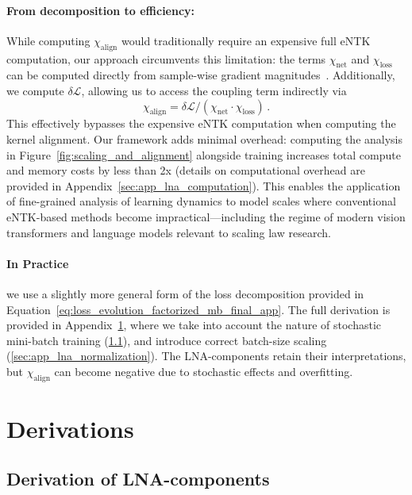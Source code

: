 \paragraph{From decomposition to efficiency:} While computing $\chi_{\text{align}}$ would traditionally require an expensive full eNTK computation, our approach circumvents this limitation: the terms $\chi_{\text{net}}$ and $\chi_{\text{loss}}$ can be computed directly from sample-wise gradient magnitudes~\cite{novak19a-pre,yousefpour22a-pre}. Additionally, we compute $\delta \mathcal{L}$, allowing us to access the coupling term indirectly via 
\begin{equation}
    {\chi_{\text{align}} = {\delta \mathcal{L}} / ({\chi_{\text{net}} \cdot \chi_{\text{loss}}})} \, .
\end{equation}
This effectively bypasses the expensive eNTK computation when computing the kernel alignment.  
Our framework adds minimal overhead: computing the analysis in Figure~\ref{fig:scaling_and_alignment} alongside training increases total compute and memory costs by less than 2x (details on computational overhead are provided in Appendix~\ref{sec:app_lna_computation}).
This enables the application of fine-grained analysis of learning dynamics to model scales where conventional eNTK-based methods become impractical—including the regime of modern vision transformers and language models relevant to scaling law research. 

\paragraph{In Practice} we use a slightly more general form of the loss decomposition provided in Equation~\ref{eq:loss_evolution_factorized_mb_final_app}. 
The full derivation is provided in Appendix~\ref{sec:derivations}, where we take into account the nature of stochastic mini-batch training (\ref{sec:derivation_lnas}), and introduce correct batch-size scaling (\ref{sec:app_lna_normalization}).
The LNA-components retain their interpretations, but $\chi_{\text{align}}$ can become negative due to stochastic effects and overfitting. 



\section{Derivations}\label{sec:derivations}
\subsection{Derivation of LNA-components}\label{sec:derivation_lnas}

